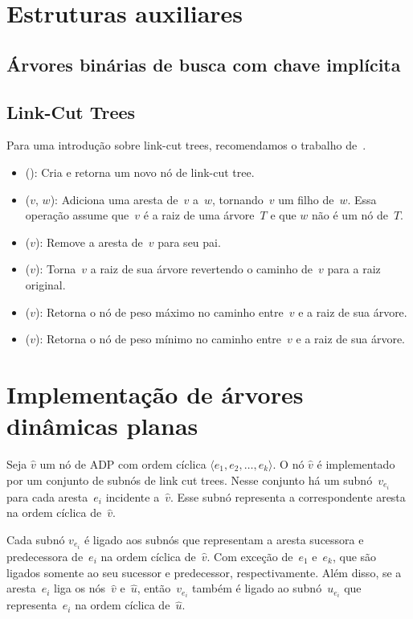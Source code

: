 \section{Estruturas auxiliares}
\subsection{Árvores binárias de busca com chave implícita}
\subsection{Link-Cut Trees}
\label{sec:linkcuttree}

Para uma introdução sobre link-cut trees, recomendamos o trabalho de~\cite{linkcuttree}.

\begin{itemize}
\item \linkcutCreate(): Cria e retorna um novo nó de link-cut tree.
\item \linkcutAddEdge($v$, $w$): Adiciona uma aresta de~$v$ a~$w$, tornando~$v$ um filho de~$w$. Essa operação assume que~$v$ é a raiz de uma árvore~$T$ e que $w$ não é um nó de~$T$.
\item \linkcutDelEdge($v$): Remove a aresta de~$v$ para seu pai.
\item \linkcutEvert($v$): Torna~$v$ a raiz de sua árvore revertendo o caminho de~$v$ para a raiz original.
\item \linkcutMax($v$): Retorna o nó de peso máximo no caminho entre~$v$ e a raiz de sua árvore.
\item \linkcutMin($v$): Retorna o nó de peso mínimo no caminho entre~$v$ e a raiz de sua árvore.
\end{itemize}


\section{Implementação de árvores dinâmicas planas}


Seja $\hat v$ um nó de ADP com ordem cíclica $\langle e_1, e_2, \ldots, e_k\rangle$.
O nó $\hat v$ é implementado por um conjunto de subnós de link cut trees.
Nesse conjunto há um subnó~$v_{e_i}$ para cada aresta~$e_i$ incidente a~$\hat v$.
Esse subnó representa a correspondente aresta na ordem cíclica de~$\hat v$.

Cada subnó $v_{e_i}$ é ligado aos subnós que representam a aresta sucessora e predecessora de~$e_i$ na ordem cíclica de~$\hat v$.
Com exceção de~$e_1$ e~$e_k$, que são ligados somente ao seu sucessor e predecessor, respectivamente.
Além disso, se a aresta~$e_i$ liga os nós~$\hat v$ e~$\hat u$, então~$v_{e_i}$ também é ligado ao subnó~$u_{e_i}$ que representa~$e_i$ na ordem cíclica de~$\hat u$.

